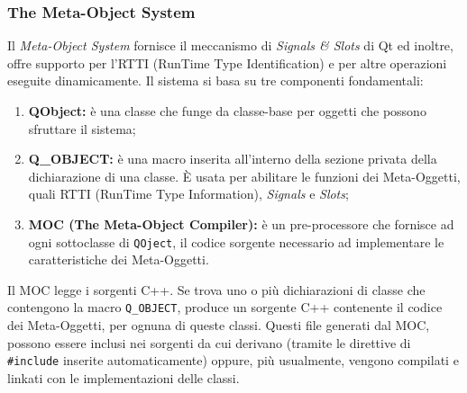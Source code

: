 	\subsubsection{The Meta-Object System}
	\label{mos}
	Il \textit{Meta-Object System} fornisce il meccanismo di \textit{Signals \& Slots}\glossario{} di Qt\glossario{} ed inoltre, offre supporto per l'RTTI\glossario{} (RunTime Type Identification) e per altre operazioni eseguite dinamicamente. Il sistema si basa su tre componenti fondamentali:
	\begin{enumerate}
	\item\textbf{QObject:} è una classe che funge da classe-base per oggetti che possono sfruttare il sistema;
	\item\textbf{Q\_OBJECT:} è una macro inserita all'interno della sezione privata della dichiarazione di una classe. È usata per abilitare le funzioni dei Meta-Oggetti, quali RTTI (RunTime Type Information)\glossario{}, \textit{Signals}\glossario{} e \textit{Slots}\glossario;
	\item\textbf{MOC (\textbf{The Meta-Object Compiler}):} è un pre-processore che fornisce ad ogni sottoclasse di \verb!QOject!, il codice sorgente necessario ad implementare le caratteristiche dei Meta-Oggetti.
	\end{enumerate}
	Il MOC legge i sorgenti C++. Se trova uno o più dichiarazioni di classe che contengono la macro \verb!Q_OBJECT!, produce un sorgente C++ contenente il codice dei Meta-Oggetti, per ognuna di queste classi. Questi file generati dal MOC, possono essere inclusi nei sorgenti da cui derivano (tramite le direttive di \verb!#include! inserite automaticamente) oppure, più usualmente, vengono compilati e linkati con le implementazioni delle classi.
	

